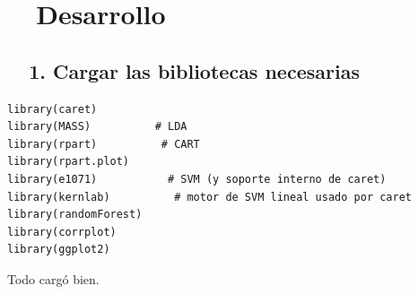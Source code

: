 \documentclass[11pt,a4paper]{article}
\begin{document}
\section{\faCogs\ \ Desarrollo}

\subsection{\faBoxOpen\ \ 1. Cargar las bibliotecas necesarias}
\begin{lstlisting}[style=styleR]
library(caret)
library(MASS)          # LDA
library(rpart)          # CART
library(rpart.plot)
library(e1071)           # SVM (y soporte interno de caret)
library(kernlab)          # motor de SVM lineal usado por caret
library(randomForest)
library(corrplot)
library(ggplot2)
\end{lstlisting}
Todo cargó bien.
\end{document}
